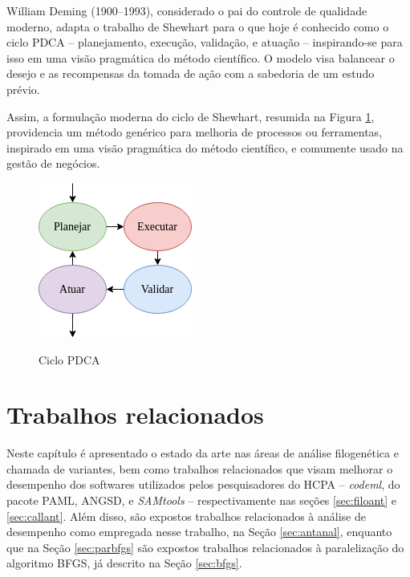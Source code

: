 \documentclass[cic,tc]{iiufrgs}
\begin{document}
William Deming (1900--1993), considerado o pai do controle de qualidade
moderno, adapta o trabalho de Shewhart para o que hoje é conhecido como o ciclo
PDCA -- planejamento, execução, validação, e atuação -- inspirando-se para
isso em uma visão pragmática do método científico. O modelo visa balancear o
desejo e as recompensas da tomada de ação com a sabedoria de um estudo prévio.

Assim, a formulação moderna do ciclo de Shewhart, resumida na Figura
\ref{fig:pdca_orig}, providencia um método genérico para melhoria de processos
ou ferramentas, inspirado em uma visão pragmática do método científico, e
comumente usado na gestão de negócios.

\begin{figure} \caption{Ciclo PDCA} \begin{center}
\includegraphics[width=0.25\linewidth]{img/pdca_orig.png} \end{center}
 \label{fig:pdca_orig} \end{figure}


%
%
%
%

\chapter{Trabalhos relacionados}
\label{chap:anteriores}

Neste capítulo é apresentado o estado da arte nas áreas de análise filogenética
e chamada de variantes, bem como trabalhos relacionados que visam melhorar o
desempenho dos softwares utilizados pelos pesquisadores do HCPA --
\textit{codeml}, do pacote PAML, ANGSD, e \textit{SAMtools} -- respectivamente nas seções
\ref{sec:filoant} e \ref{sec:callant}. Além disso, são expostos trabalhos
relacionados à análise de desempenho como empregada nesse trabalho, na Seção
\ref{sec:antanal}, enquanto que na Seção \ref{sec:parbfgs} são expostos
trabalhos relacionados à paralelização do algoritmo BFGS, já descrito na Seção
\ref{sec:bfgs}.
\end{document}
